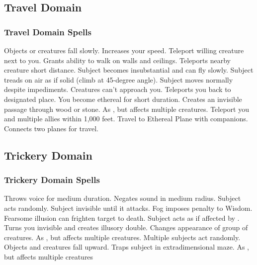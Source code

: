 \subsection{Travel Domain}

\subsubsection{Travel Domain Spells}
\begin{spelllist}
   Objects or creatures fall slowly.
   Increases your speed.
   Teleport willing creature next to you.
   Grants ability to walk on walls and ceilings.
   Teleports nearby creature short distance.
   Subject becomes insubstantial and can fly slowly.
   Subject treads on air as if solid (climb at 45-degree angle).
   Subject moves normally despite impediments.
  \spellhead[5]{}
  \spellhead[5]{}
   Creatures can't approach you.
   Teleports you back to designated place.
   You become ethereal for short duration.
   Creates an invisible passage through wood or stone.
   As , but affects multiple creatures.
   Teleport you and multiple allies within 1,000 feet.
   Travel to Ethereal Plane with companions.
   Connects two planes for travel.
\end{spelllist}

\subsection{Trickery Domain}
\subsubsection{Trickery Domain Spells}
\begin{spelllist}
  \spellhead[1]{}
   Throws voice for medium duration.
  \spellhead[2]{}
   Negates sound in medium radius.
   Subject acts randomly.
   Subject invisible until it attacks.
   Fog imposes  penalty to Wisdom.
   Fearsome illusion can frighten target to death.
  \spellhead[5]{}
   Subject acts as if affected by .
   Turns you invisible and creates illusory double.
   Changes appearance of group of creatures.
   As , but affects multiple creatures.
   Multiple subjects act randomly.
  \spellhead[8]{}
   Objects and creatures fall upward.
   Traps subject in extradimensional maze.
   As , but affects multiple creatures
\end{spelllist}

